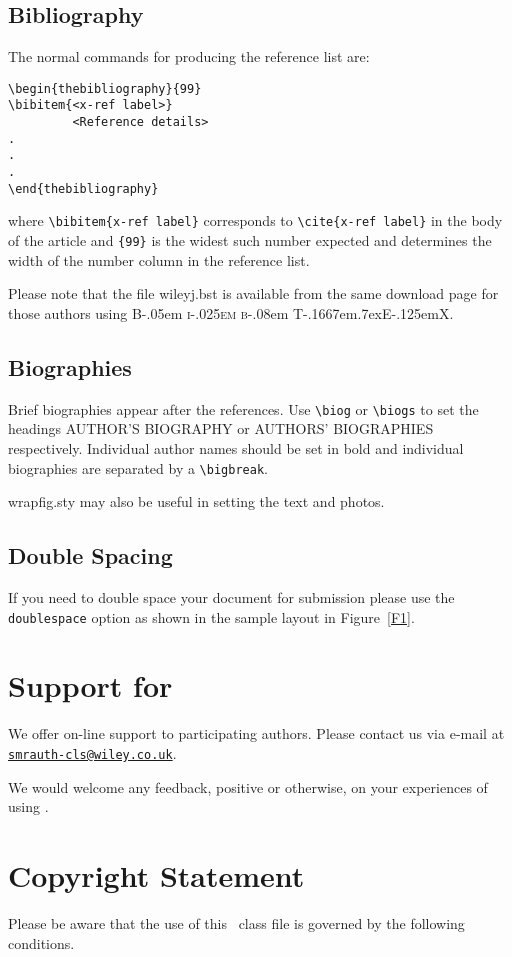 \documentclass[times]{smrauth}
\newcommand\BibTeX{{\rmfamily B\kern-.05em \textsc{i\kern-.025em b}\kern-.08em
T\kern-.1667em\lower.7ex\hbox{E}\kern-.125emX}}
\begin{document}
\subsection{Bibliography}
The normal commands for producing the reference list are:
\begin{verbatim}
\begin{thebibliography}{99}
\bibitem{<x-ref label>}
         <Reference details>
.
.
.
\end{thebibliography}
\end{verbatim}
where \verb"\bibitem{x-ref label}"
corresponds to \verb"\cite{x-ref label}" in the body of the article
and \verb"{99}" is the widest such number expected and determines
the width of the number column in the reference list.

Please note that the file \textsf{wileyj.bst} is available from
the same download page for those authors using \BibTeX.

\subsection{Biographies}
Brief biographies appear after the references.
Use \verb"\biog" or \verb"\biogs" to set the headings AUTHOR'S BIOGRAPHY
or AUTHORS' BIOGRAPHIES respectively. Individual author names
should be
set in bold and individual biographies are separated by a
\verb"\bigbreak".

\textsf{wrapfig.sty} may also be useful in setting the text and photos.


\subsection{Double Spacing}
If you need to double space your document for submission please
use the \verb+doublespace+ option as shown in the sample layout in
Figure~\ref{F1}.

\section{Support for \textsf{\journalclass}}
We offer on-line support to participating authors. Please contact
us via e-mail at\\
\href{mailto:smrauth-cls@wiley.co.uk}{\texttt{smrauth-cls@wiley.co.uk}}.

We would welcome any feedback, positive or otherwise, on your
experiences of using \textsf{\journalclass}.

\section{Copyright Statement}
Please  be  aware that the use of  this \LaTeXe\ class file is
governed by the following conditions.
\end{document}
